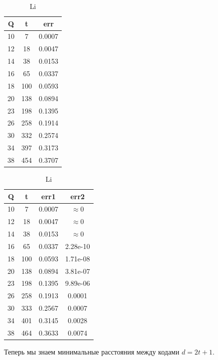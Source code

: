 \begin{table}[h]
	\begin{minipage}{0.48\textwidth}
		\centering
		\begin{tabular}{|c|c|c|}
			\hline Q & t & err \\ \hline
			10 & 7 & 0.0007 \\ \hline
			12 & 18 & 0.0047 \\ \hline
			14 & 38 & 0.0153 \\ \hline
			16 & 65 & 0.0337 \\ \hline
			18 & 100 & 0.0593 \\ \hline
			20 & 138 & 0.0894 \\ \hline
			23 & 198 & 0.1395 \\ \hline
			26 & 258 & 0.1914 \\ \hline
			30 & 332 & 0.2574 \\ \hline
			34 & 397 & 0.3173 \\ \hline
			38 & 454 & 0.3707 \\ \hline
		\end{tabular}
		\caption*{Hamming}
	\end{minipage}
	\hfill
	\begin{minipage}{0.48\textwidth}
		\centering
		\begin{tabular}{|c|c|c|c|}
			\hline Q & t & err1 & err2 \\ \hline
			10 & 7 & 0.0007 & $\approx 0$ \\ \hline
			12 & 18 & 0.0047 & $\approx 0$ \\ \hline
			14 & 38 & 0.0153 & $\approx 0$ \\ \hline
			16 & 65 & 0.0337 & 2.28e-10 \\ \hline
			18 & 100 & 0.0593 & 1.71e-08 \\ \hline
			20 & 138 & 0.0894 & 3.81e-07 \\ \hline
			23 & 198 & 0.1395 & 9.89e-06 \\ \hline
			26 & 258 & 0.1913 & 0.0001 \\ \hline
			30 & 333 & 0.2567 & 0.0007 \\ \hline
			34 & 401 & 0.3145 & 0.0028 \\ \hline
			38 & 464 & 0.3633 & 0.0074 \\ \hline
		\end{tabular}
		\caption*{Li}
	\end{minipage}
\end{table}

Теперь мы знаем минимальные расстояния между кодами $d = 2t+1$.

